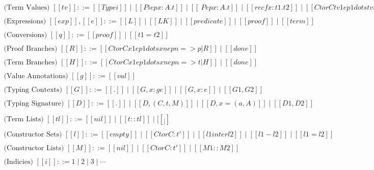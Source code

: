 \begin{center}
  \begin{math}
    \begin{array}{llllllllllllllllll}
      \text{(Term Values) } [[tv]] ::= [[Type i]] \mid [[Pi ep x : A . t]] \mid [[\ P ep x : A . t]] \mid [[rec f x : t1 . t2]] \mid [[Ctor C tv1 ep1 dots tvn epn]]\\
      \\
      \text{(Expressions) } [[exp]],[[e]] ::= [[L]] \mid [[LK]] \mid [[predicate]] \mid [[proof]] \mid [[term]]\\
      \\
      \text{(Conversions) } [[q]] ::= [[proof]] \mid [[t1 = t2]]\\
      \\
      \text{(Proof Branches) } [[R]] ::= [[Ctor C x1 ep1 dots xn epn => p | R]] \mid [[done]]\\
      \\
      \text{(Term Branches) } [[H]] ::= [[Ctor C x1 ep1 dots xn epn => t | H]] \mid [[done]]\\
      \\
      \text{(Value Annotations) } [[g]] ::= [[val]]\\
      \\
      \text{(Typing Contexts) } [[G]] ::= [[.]] \mid [[G , x : g e]] \mid [[G , x : e]] \mid [[G1 , G2]]\\
      \\
      \text{(Typing Signature) } [[D]] ::= [[.]] \mid [[D , ( C , t , M )]] \mid [[D , x = ( a , A )]] \mid [[D1 , D2]]\\
      \\
      \text{(Term Lists) } [[tl]] ::= [[nil]] \mid [[t :: tl]] \mid [[_]]\\
      \\
      \text{(Constructor Sets) } [[l]] ::= [[empty]] \mid [[{ Ctor C : t'}]] \mid [[l1 inter l2]] \mid [[l1 - l2]] \mid [[l1 = l2]]\\
      \\
      \text{(Constructor Lists) } [[M]] ::= [[nil]] \mid [[Ctor C : t']] \mid [[M1 :: M2]]\\
      \\
      \text{(Indicies) } [[i]] ::= 1 \mid 2 \mid 3 \mid \cdots\\        
    \end{array}
  \end{math}
\end{center}

